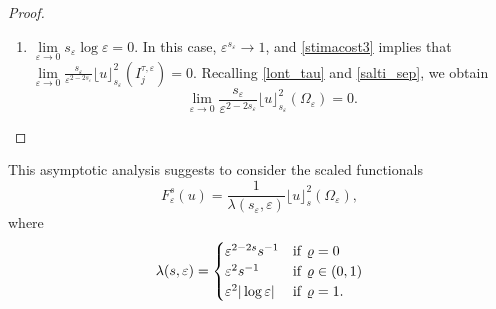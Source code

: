 \documentclass[11pt]{article}
\def\e{\varepsilon}
\begin{document}
\begin{proof}
\begin{enumerate}
In this case, $\e^{s_\e}\to \varrho\in(0,1)$; by \eqref{stimacost3} it follows that 
\begin{equation}\label{stimacost5}
\frac{k^2}{k^2+1}(1-\varrho^2) h_j^2\leq 
\lim_{\e\to 0}\frac{s_\e}{\e^{2-2s_\e}}\lfloor u\rfloor_{s_\e}^2(I_j^{\tau,\e})\leq(1-\varrho^2)h_j^2. 
\end{equation}
Recalling \eqref{lont_tau} and \eqref{salti_sep}, and summing up over the jumps set of $v$, we then obtain 
$$\lim_{\e\to 0} \frac{s_\e}{\e^{2-2s_\e}}\lfloor u\rfloor_{s_\e}^2(\Omega_\e)=(1-\varrho^2)\sum_{t\in S(v)} |v(t^+)-v(t^-)|^2.$$
\item[$\bullet$] $\lim\limits_{\e\to 0}s_\e\log\e=0$.
In this case, $\e^{s_\e}\to 1$, and \eqref{stimacost3} implies that $\lim\limits_{\e\to 0}\frac{s_\e}{\e^{2-2s_\e}}\lfloor u\rfloor_{s_\e}^2(I_j^{\tau,\e})=0.$ 
Recalling \eqref{lont_tau} and \eqref{salti_sep}, we obtain
$$\lim_{\e\to 0} \frac{s_\e}{\e^{2-2s_\e}}\lfloor u\rfloor_{s_\e}^2(\Omega_\e)=0.$$ 
\end{enumerate} 
\end{proof}  
This asymptotic analysis suggests to consider the scaled functionals 
$$F_\e^{s}(u)=%
\frac{1}{\lambda(s_\e,\e)}\lfloor u\rfloor_{s}^2(\Omega_\e),$$
where 
\begin{equation}\label{lambda}
\lambda(s,\e)=\begin{cases}
\e^{2-2s}s^{-1} & {\rm if }\ \varrho=0\\
\e^{2}s^{-1} & {\rm if }\ \varrho\in (0,1)\\
\e^2|\log\e| & {\rm if }\ \varrho=1.
\end{cases}
\end{equation}
\end{document}
